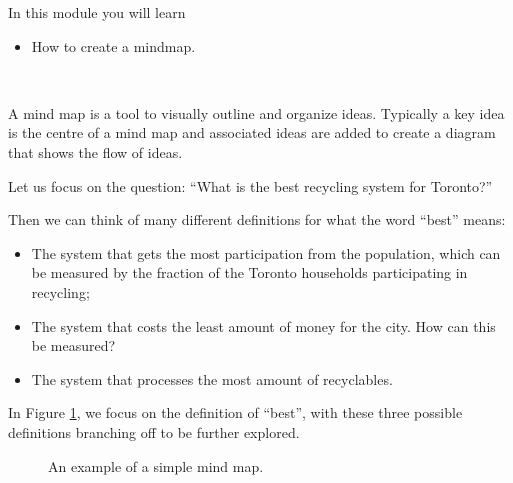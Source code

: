 	In this module you will learn
	\begin{itemize}
		\item How to create a mindmap.
	\end{itemize}

\hfill \\




A mind map is a tool to visually outline and organize ideas. Typically a key idea is the centre of a mind map and associated ideas are added to create a diagram that shows the flow of ideas. 

\begin{example}

Let us focus on the question: ``What is the best recycling system for Toronto?''

Then we can think of many different definitions for what the word ``best'' means:

\begin{itemize}
	\item The system that gets the most participation from the population, which can be measured by the fraction of the Toronto households participating in recycling;
	\item The system that costs the least amount of money for the city. How can this be measured?
	\item The system that processes the most amount of recyclables.
\end{itemize}

In Figure \ref{mindmap1}, we focus on the definition of ``best'', with these three possible definitions branching off to be further explored.

\end{example}


\begin{figure}[!ht]
\caption{An example of a simple mind map.}
\label{mindmap1}
\end{figure}

